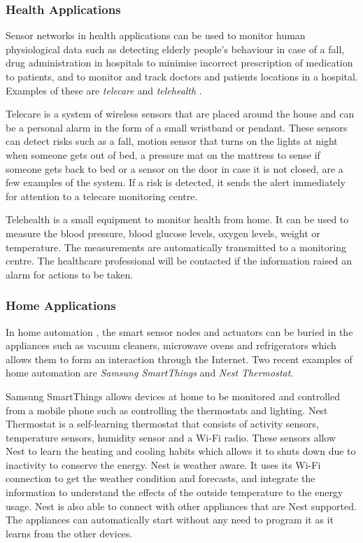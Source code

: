 \subsubsection{Health Applications}
Sensor networks in health applications can be used to monitor human physiological data such as detecting elderly people's behaviour in case of a fall, drug administration \cite{telemonitoring} in hospitals to minimise incorrect prescription of medication to patients, and to monitor and track doctors and patients locations in a hospital. Examples of these are \textit{telecare} and \textit{telehealth} \cite{telehealth}.

Telecare is a system of wireless sensors that are placed around the house and can be a personal alarm in the form of a small wristband or pendant. These sensors can detect risks such as a fall, motion sensor that turns on the lights at night when someone gets out of bed, a pressure mat on the mattress to sense if someone gets back to bed or a sensor on the door in case it is not closed, are a few examples of the system. If a risk is detected, it sends the alert immediately for attention to a telecare monitoring centre. 

Telehealth is a small equipment to monitor health from home. It can be used to measure the blood pressure, blood glucose levels, oxygen levels, weight or temperature. The measurements are automatically transmitted to a monitoring centre. The healthcare professional will be contacted if the information raised an alarm for actions to be taken. 

\subsubsection{Home Applications}
In home automation \cite{homeautomation}, the smart sensor nodes and actuators can be buried in the appliances such as vacuum cleaners, microwave ovens and refrigerators which allows them to form an interaction through the Internet. Two recent examples of home automation are \textit{Samsung SmartThings} and \textit{Nest Thermostat}.

Samsung SmartThings allows devices at home to be monitored and controlled from a mobile phone such as controlling the thermostats and lighting. Nest Thermostat is a self-learning thermostat that consists of activity sensors, temperature sensors, humidity sensor and a Wi-Fi radio. These sensors allow Nest to learn the heating and cooling habits which allows it to shuts down due to inactivity to conserve the energy. Nest is weather aware. It uses its Wi-Fi connection to get the weather condition and forecasts, and integrate the information to understand the effects of the outside temperature to the energy usage. Nest is also able to connect with other appliances that are Nest supported. The appliances can automatically start without any need to program it as it learns from the other devices.


